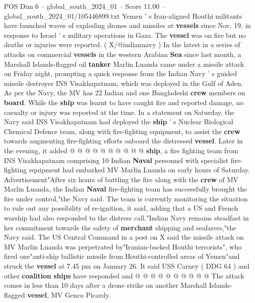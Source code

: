 \begin{textsample}{POS Dim 6 – global\_south\_2024\_01 – Score 11.00 – global\_south\_2024\_01/105446899.txt}  \label{ex:f6_pos_081}
Yemen ' s Iran-aligned Houthi militants have launched waves of exploding drones and missiles at \textbf{vessels} since Nov. 19, in response to Israel ' s military operations in Gaza.
The \textbf{vessel} was on fire but no deaths or injuries were reported. ( X/@indiannavy ) In the latest in a series of attacks on commercial \textbf{vessels} in the western Arabian \textbf{Sea} since last month, a Marshall Islands-flagged oil \textbf{tanker} Marlin Luanda came under a missile attack on Friday night, prompting a quick response from the Indian Navy ' s guided missile destroyer INS Visakhapatnam, which was deployed in the Gulf of Aden.
As per the Navy, the MV has 22 Indian and one Bangladeshi \textbf{crew} members on \textbf{board}.
While the \textbf{ship} was learnt to have caught fire and reported damage, no casualty or injury was reported at the time.
In a statement on Saturday, the Navy said INS Visakhapatnam had deployed the \textbf{ship} ' s Nuclear Biological Chemical Defence team, along with fire-fighting equipment, to assist the \textbf{crew} towards augmenting fire-fighting efforts onboard the distressed \textbf{vessel}.
Later in the evening, it added @ @ @ @ @ @ @ @ @ @ \textbf{ship}, a fire fighting team from INS Visakhapatnam comprising 10 Indian \textbf{Naval} personnel with specialist fire-fighting equipment had embarked MV Marlin Luanda on early hours of Saturday.
Advertisement"After six hours of battling the fire along with the \textbf{crew} of MV Marlin Luanda, the Indian \textbf{Naval} fire-fighting team has successfully brought the fire under control,"the Navy said.
The team is currently monitoring the situation to rule out any possibility of re-ignition, it said, adding that a US and French warship had also responded to the distress call."Indian Navy remains steadfast in her commitment towards the safety of \textbf{merchant} shipping and seafarers,"the Navy said.
The US Central Command in a post on X said the missile attack on MV Marlin Luanda was perpetrated by"Iranian-backed Houthi terrorists", who fired one"anti-ship ballistic missile from Houthi-controlled areas of Yemen"and struck the \textbf{vessel} at 7.45 pm on January 26.
It said USS Carney ( DDG 64 ) and other \textbf{coalition} \textbf{ships} have responded and @ @ @ @ @ @ @ @ @ @ The attack comes in less than 10 days after a drone strike on another Marshall Islands-flagged \textbf{vessel}, MV Genco Picardy.

\end{textsample}
